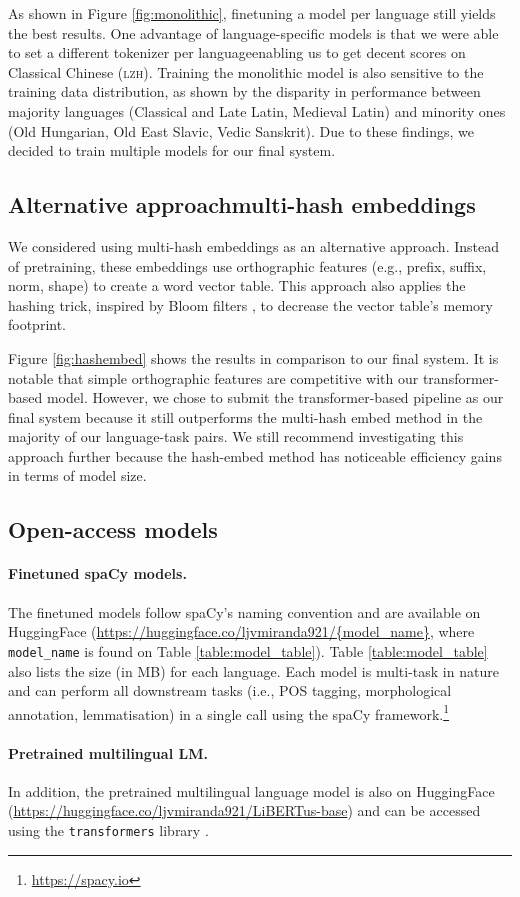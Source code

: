 \documentclass[11pt]{article}
\begin{document}


As shown in Figure \ref{fig:monolithic}, finetuning a model per language still yields the best results.
One advantage of language-specific models is that we were able to set a different tokenizer per language\textemdash enabling us to get decent scores on Classical Chinese (\textsc{lzh}).
Training the monolithic model is also sensitive to the training data distribution, as shown by the disparity in performance between majority languages (Classical and Late Latin, Medieval Latin) and minority ones (Old Hungarian, Old East Slavic, Vedic Sanskrit).
Due to these findings, we decided to train multiple models for our final system.


\subsection{Alternative approach\textemdash multi-hash embeddings}

We considered using multi-hash embeddings \cite{miranda-etal-2022-multi} as an alternative approach.
Instead of pretraining, these embeddings use orthographic features (e.g., prefix, suffix, norm, shape) to create a word vector table.
This approach also applies the hashing trick, inspired by Bloom filters \cite{bloom-1970-space}, to decrease the vector table's memory footprint.


Figure \ref{fig:hashembed} shows the results in comparison to our final system.
It is notable that simple orthographic features are competitive with our transformer-based model.
However, we chose to submit the transformer-based pipeline as our final system because it still outperforms the multi-hash embed method in the majority of our language-task pairs.
We still recommend investigating this approach further because the hash-embed method has noticeable efficiency gains in terms of model size.

\subsection{Open-access models}

\paragraph{Finetuned spaCy models.} The finetuned models follow spaCy's naming convention and are available on HuggingFace (\url{https://huggingface.co/ljvmiranda921/{model\_name}}, where \texttt{model\_name} is found on Table \ref{table:model_table}).
Table \ref{table:model_table} also lists the size (in MB) for each language.
Each model is multi-task in nature and can perform all downstream tasks (i.e., POS tagging, morphological annotation, lemmatisation) in a single call using the spaCy framework.\footnote[3]{\url{https://spacy.io}}

\paragraph{Pretrained multilingual LM.} 
In addition, the pretrained multilingual language model is also on HuggingFace (\url{https://huggingface.co/ljvmiranda921/LiBERTus-base}) and can be accessed using the \texttt{transformers} library \cite{wolf-etal-2020-transformers}.
\end{document}
